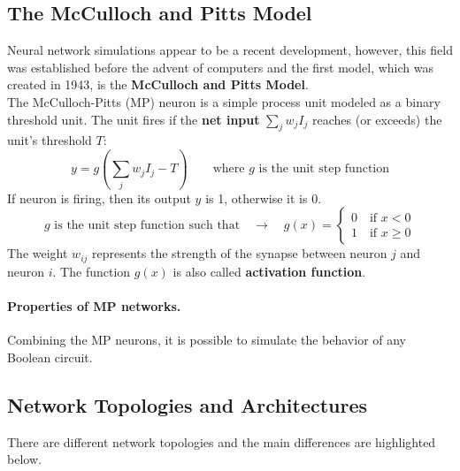 \subsection{The McCulloch and Pitts Model}
Neural network simulations appear to be a recent development, however, this field was established before the advent of computers and the first model, which was created in 1943, is the \textbf{McCulloch and Pitts Model}.\\
The McCulloch-Pitts (MP) neuron is a simple process unit modeled as a binary threshold unit.
The unit fires if the \textbf{net input} $\sum_j w_jI_j$ reaches (or exceeds) the unit's threshold $T$:
$$y = g\left(\sum_j w_jI_j - T\right) \qquad \text{where } g \text{ is the unit step function}$$
If neuron is firing, then its output $y$ is 1, otherwise it is 0.
$$g \text{ is the unit step function such that} \quad \rightarrow \quad g(x) = 
\begin{cases}
0 \quad \text{if }x<0\\
1 \quad \text{if }x \geq 0
\end{cases}$$
The weight $w_{ij}$ represents the strength of the synapse between neuron $j$ and neuron $i$. The function $g(x)$ is also called \textbf{activation function}.

\paragraph*{Properties of MP networks.} Combining the MP neurons, it is possible to simulate the behavior of any Boolean circuit.

\subsection{Network Topologies and Architectures} There are different network topologies and the main differences are highlighted below.

